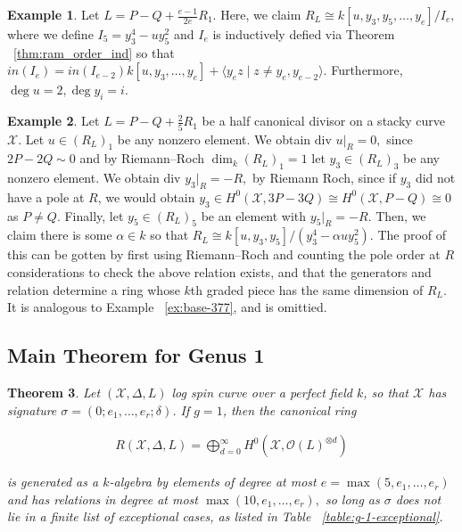 \documentclass{amsart}
\theoremstyle{plain}
\newtheorem{thm}{Theorem}[section]
\theoremstyle{definition}
\newtheorem{example}[thm]{Example}
\theoremstyle{remark}
\numberwithin{equation}{section}
\newcommand\ssec{\subsection}
\newcommand \sx{\mathscr X}
\newcommand\sco{{\mathscr O}}
\newcommand \di{\text{div }}
\newcommand \halfcan{L}
\begin{document}
\begin{example}
\label{eg:exception-1-e}
Let $L = P - Q + \frac{e-1}{2e}R_1.$ Here, we claim $R_L \cong k[u,y_3, y_5, \ldots, y_e]/I_e,$ where we define $I_5 = y_3^4 - uy_5^2$ and $I_e$ is inductively defied via Theorem ~\ref{thm:ram_order_ind} so that $in(I_e) = in(I_{e-2})k[u, y_3,\ldots, y_e] + \langle y_e z \mid z \neq y_e, y_{e-2} \rangle.$
Furthermore, $\deg u = 2, \deg y_i = i$.
\end{example}
\fi

\begin{example}
\label{eg:exception-1-5}
Let $L = P - Q + \frac{2}{5}R_1$ be a half canonical divisor on a stacky curve $\sx$. Let $u \in (R_L)_1$ be any nonzero element. We obtain $\di u|_R = 0,$ since $2P -2Q \sim 0$ and by Riemann--Roch $\dim_k (R_L)_1 = 1$ let $y_3 \in (R_L)_3$ be any nonzero element. We obtain $\di y_3|_R = - R,$ by Riemann Roch, since if $y_3$ did not have a pole at $R$, we would obtain $y_3 \in H^0(\sx,3P-3Q) \cong H^0(\sx,P-Q) \cong 0$ as $P \neq Q$. Finally, let $y_5 \in (R_L)_5$ be an element with $y_5|_R = -R$. Then, we claim there is some $\alpha \in k$ so that
$R_L \cong k[u,y_3, y_5]/(y_3^4 - \alpha uy_5^2).$
The proof of this can be gotten by first using Riemann--Roch and counting the pole order at $R$ considerations to check the above relation exists, and that the generators and relation determine a ring whose $k$th graded piece has the same dimension of $R_L$. It is analogous to Example ~\ref{ex:base-377}, and is omittied.
\end{example}


\ssec{Main Theorem for Genus 1}
\label{ssec:main_g_1}

\begin{thm}
\label{thm:g_1_generators_relations}
Let $(\sx, \Delta, \halfcan)$ log spin curve over a perfect field $k$,
so that $\sx$ has signature $\sigma = (0; e_1, \ldots, e_r; \delta)$.
If $g = 1$, then the canonical ring

\begin{align*}
	R(\sx, \Delta, \halfcan) = \bigoplus_{d = 0}^\infty H^0(\sx, \sco(L)^{\otimes d})
\end{align*}

\noindent
is generated as a $k$-algebra by elements of degree at most $e =
\max(5, e_1, \ldots, e_r)$ and has relations in degree at most $\max
(10, e_1, \ldots, e_r),$ so long as $\sigma$ does not lie in a
finite list of exceptional cases, as listed in Table
~\ref{table:g-1-exceptional}.
\end{thm}
\end{document}
